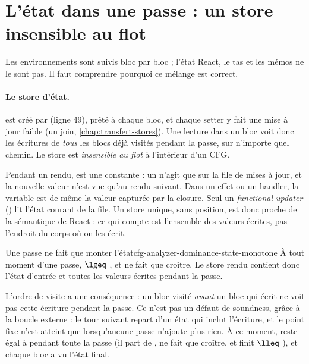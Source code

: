 \section{L'état dans une passe : un store insensible au flot}
\label{sec:cfg-analyzer-dominance-etat}

Les environnements sont suivis bloc par bloc ; l'état React, le tas et les
mémos ne le sont pas. Il faut comprendre pourquoi ce mélange est correct.

\paragraph{Le store d'état.}  est créé par
 (ligne 49), prêté à chaque bloc, et chaque setter y fait
une mise à jour faible (un join, \cref{chap:transfert-stores}). Une lecture
 dans un bloc voit donc les écritures de \emph{tous} les
blocs déjà visités pendant la passe, sur n'importe quel chemin. Le store est
\emph{insensible au flot} à l'intérieur d'un CFG.

\begin{react}
  Pendant un rendu,  est une constante : un 
  n'agit que sur la file de mises à jour, et la nouvelle valeur n'est vue
  qu'au rendu suivant. Dans un effet ou un handler, la variable 
  est de même la valeur capturée par la closure. Seul un \emph{functional
  updater} () lit l'état courant de la file. Un
  store unique, sans position, est donc proche de la sémantique de React :
  ce qui compte est l'ensemble des valeurs écrites, pas l'endroit du corps où
  on les écrit.
\end{react}

\begin{invariant}{Une passe ne fait que monter l'état}{cfg-analyzer-dominance-state-monotone}
  À tout moment d'une passe,  $\lgeq$ , et
   ne fait que croître. Le store rendu contient donc l'état
  d'entrée et toutes les valeurs écrites pendant la passe.
\end{invariant}

L'ordre de visite a une conséquence : un bloc visité \emph{avant} un bloc qui
écrit ne voit pas cette écriture pendant la passe. Ce n'est pas un défaut de
soundness, grâce à la boucle externe : le tour suivant repart d'un état qui
inclut l'écriture, et le point fixe n'est atteint que lorsqu'aucune passe
n'ajoute plus rien. À ce moment,  reste égal à 
pendant toute la passe (il part de , ne fait que croître, et finit
$\lleq$ ), et chaque bloc a vu l'état final.


